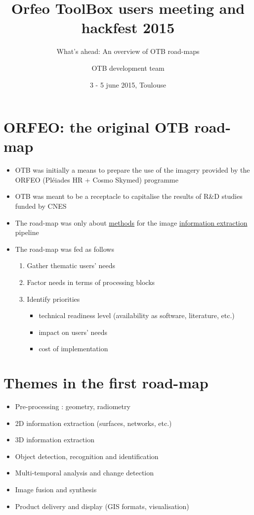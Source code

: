 \documentclass[8pt]{beamer}
\subtitle{What's ahead: An overview of OTB road-maps}
\author{OTB development team}
\date{3 - 5 june 2015, Toulouse}
\title{Orfeo ToolBox users meeting and hackfest 2015}
\begin{document}
\maketitle


\section{ORFEO: the original OTB road-map}
\label{sec-1}
\begin{itemize}
\item OTB was initially a means to prepare the use of the imagery provided
by the ORFEO (Pléiades HR + Cosmo Skymed) programme
\item OTB was meant to be a receptacle to capitalise the results of R\&D
studies funded by CNES
\item The road-map was only about \uline{methods} for the image \uline{information
extraction} pipeline
\item The road-map was fed as follows
\begin{enumerate}
\item Gather thematic users' needs
\item Factor needs in terms of processing blocks
\item Identify priorities
\begin{itemize}
\item technical readiness level (availability as software, literature, etc.)
\item impact on users' needs
\item cost of implementation
\end{itemize}
\end{enumerate}
\end{itemize}

\section{Themes in the first road-map}
\label{sec-2}
\begin{itemize}
\item Pre-processing : geometry, radiometry
\item 2D information extraction (surfaces, networks, etc.)
\item 3D information extraction
\item Object detection, recognition and identification
\item Multi-temporal analysis and change detection
\item Image fusion and synthesis
\item Product delivery and display (GIS formats, visualisation)
\end{itemize}
\end{document}
